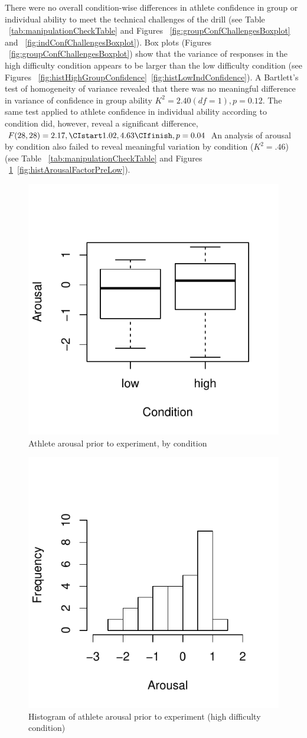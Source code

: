 There were no overall condition-wise differences in athlete confidence in group or individual ability to meet the technical challenges of the drill (see Table ~\ref{tab:manipulationCheckTable} and Figures ~\ref{fig:groupConfChallengesBoxplot} and ~\ref{fig:indConfChallengesBoxplot}).
Box plots (Figures ~\ref{fig:groupConfChallengesBoxplot}) show that the variance of responses in the high difficulty condition appears to be larger than the low difficulty condition (see Figures ~\ref{fig:histHighGroupConfidence}\nobreakdash~\ref{fig:histLowIndConfidence}).
A Bartlett's test of homogeneity of variance revealed that there was no meaningful difference in variance of confidence in group ability $K^2 = 2.40 (df = 1), p = 0.12$.  The same test applied to athlete confidence in individual ability according to condition did, however, reveal a significant difference, $F(28,28) = 2.17, \CIstart 1.02, 4.63 \CIfinish, p = 0.04$
An analysis of arousal by condition also failed to reveal meaningful variation by condition ($K^2 = .46$) (see Table ~\ref{tab:manipulationCheckTable} and Figures ~\ref{fig:arousalFactorPreBoxPlot}\nobreakdash~\ref{fig:histArousalFactorPreLow}).


\begin{figure}
  \centering
  \includegraphics[width=0.5\linewidth,keepaspectratio] {images/arousalFactorPreBoxPlot-1}
  \caption{Athlete arousal prior to experiment, by condition}
        \label{fig:arousalFactorPreBoxPlot}
    \end{figure}

\begin{figure}
  \centering
      \includegraphics[width=0.5\linewidth,keepaspectratio] {images/histArousalFactorPreHigh-1}
      \caption{Histogram of athlete arousal prior to experiment (high difficulty condition)}
        \label{fig:histArousalFactorPreHigh}
    \end{figure}

